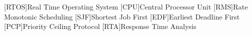 [RTOS]{Real Time Operating System}
[CPU]{Central Processor Unit}
[RMS]{Rate Monotonic Scheduling}
[SJF]{Shortest Job First}
[EDF]{Earliest Deadline First}
[PCP]{Priority Ceiling Protocol}
[RTA]{Response Time Analysis}